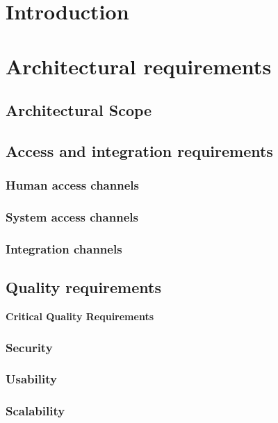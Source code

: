 \documentclass[a4paper,12pt,titlepage]{article}
\begin{document}


\tableofcontents
\newpage

\section{Introduction}

\section{Architectural requirements}
	\subsection{Architectural Scope} %
	
	\newpage
	
	\subsection{Access and integration requirements}
			\subsubsection{Human access channels}	
			\subsubsection{System access channels}	
			\subsubsection{Integration channels}
 	\subsection{Quality requirements}
 	
		\textbf{\LARGE Critical Quality Requirements}
		\subsubsection{Security}
			
			
		\subsubsection{Usability}
			
			
		\subsubsection{Scalability}
			
			
\end{document}
